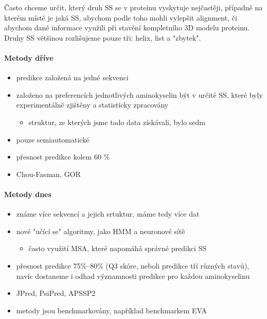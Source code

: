 \documentclass[DIV=8]{scrreprt}
\begin{document}
Často chceme určit, který druh SS se v proteinu vyskytuje nejčastěji, případně na kterém místě je jaká SS, abychom podle toho mohli vylepšit alignment, či abychom dané informace využili při stavění kompletního 3D modelu proteinu. Druhy SS většinou rozlišujeme pouze tři: helix, list a "zbytek".

\paragraph{Metody dříve}
\begin{itemize}[nosep]
    \item predikce založená na jedné sekvenci
    \item založeno na preferencích jednotlivých aminokyselin být v určité SS, které byly experimentálně zjištěny a statisticky zpracovány
\begin{itemize}[nosep]
    \item struktur, ze kterých jsme tado data získávali, bylo sedm
\end{itemize}

    \item pouze semiautomatické
    \item přesnost predikce kolem 60 \%
    \item Chou-Fasman, GOR
\end{itemize}



\paragraph{Metody dnes}
\begin{itemize}[nosep]
    \item známe více sekvencí a jejich srtuktur, máme tedy více dat
    \item nové "učící se" algoritmy, jako HMM a neuronové sítě
\begin{itemize}[nosep]
    \item často využití MSA, které napomáhá správné predikci SS
\end{itemize}

    \item přesnost predikce 75\%--80\% (Q3 skóre, neboli predikce tří různých stavů), navíc dostaneme i odhad významnosti predikce pro každou aminokyselinu
    \item JPred, PsiPred, APSSP2
    \item metody jsou benchmarkovány, například benchmarkem EVA
\end{itemize}
\end{document}
